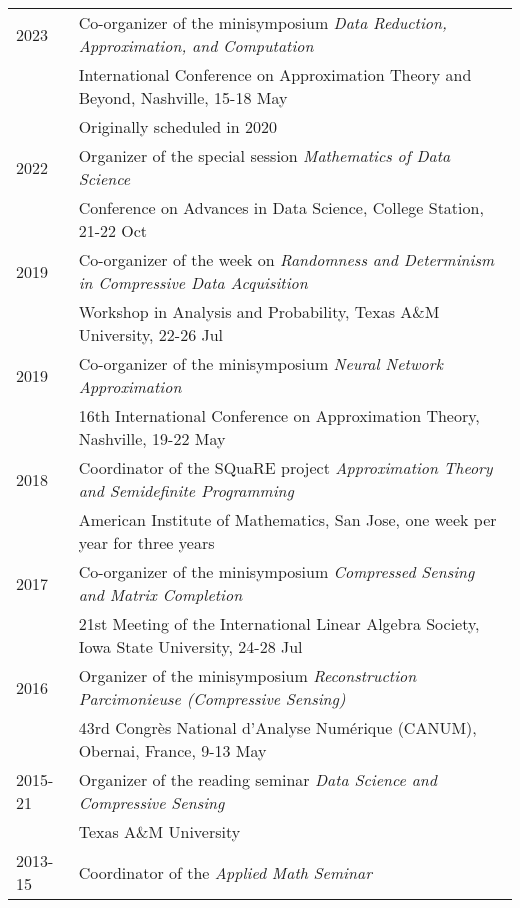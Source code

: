 \documentclass[11pt]{article}
\begin{document}
\begin{tabular}{ll}
2023 & Co-organizer of the minisymposium {\sl Data Reduction, Approximation, and Computation}\\
& International Conference on Approximation Theory and Beyond, Nashville,  15-18 May\\
& {\small Originally scheduled in 2020}\\
2022 & Organizer of the special session {\em Mathematics of Data Science}\\
& Conference on Advances in Data Science, College Station, 21-22 Oct\\
2019 & Co-organizer of the week on {\sl Randomness and Determinism in Compressive Data Acquisition}\\
& Workshop in Analysis and Probability, Texas A\&M University,  22-26 Jul\\
2019 & Co-organizer of the minisymposium {\sl Neural Network Approximation}\\
& 16th International Conference on Approximation Theory, Nashville, 19-22 May\\
2018 & Coordinator of the SQuaRE project {\sl Approximation Theory and Semidefinite Programming}\\
& American Institute of Mathematics, San Jose, one week per year for three years\\
2017 & Co-organizer of the minisymposium {\sl Compressed Sensing and Matrix Completion}\\
& 
21st Meeting of the International Linear Algebra Society,
Iowa State University, 24-28 Jul\\
2016 & Organizer of the minisymposium {\sl Reconstruction Parcimonieuse (Compressive Sensing)}\\
& 43rd Congr\`{e}s National d'Analyse Num\'{e}rique (CANUM), Obernai, France, 9-13 May\\
2015-21 & Organizer of the reading seminar {\sl Data Science and Compressive Sensing}\\
& Texas A\&M University\\
2013-15 & Coordinator of the {\sl Applied Math Seminar}\\

\end{tabular}
\end{document}
